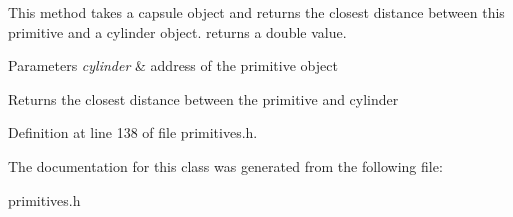 This method takes a capsule object and returns the closest distance between this primitive and a cylinder object. returns a double value.


\begin{DoxyParams}{Parameters}
{\em cylinder} & address of the primitive object \\
\hline
\end{DoxyParams}
\begin{DoxyReturn}{Returns}
the closest distance between the primitive and cylinder 
\end{DoxyReturn}


Definition at line 138 of file primitives.\+h.



The documentation for this class was generated from the following file\+:\begin{DoxyCompactItemize}
\item 
primitives.\+h\end{DoxyCompactItemize}
